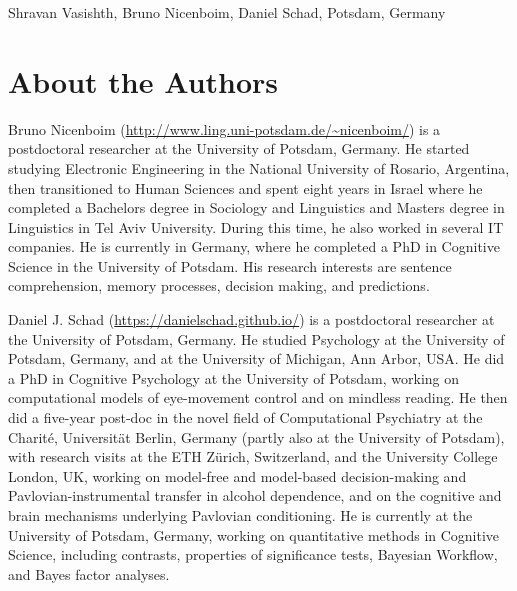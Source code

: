 \documentclass[12pt,]{krantz}
\theoremstyle{definition}
\theoremstyle{definition}
\theoremstyle{definition}
\theoremstyle{remark}
\let\BeginKnitrBlock\begin \let\EndKnitrBlock\end
\begin{document}
\BeginKnitrBlock{flushright}
Shravan Vasishth,
Bruno Nicenboim,
Daniel Schad,
Potsdam, Germany
\EndKnitrBlock{flushright}

\hypertarget{about-the-authors}{%
\chapter*{About the Authors}\label{about-the-authors}}


Bruno Nicenboim (\url{http://www.ling.uni-potsdam.de/~nicenboim/}) is a postdoctoral researcher at the University of Potsdam, Germany. He started studying Electronic Engineering in the National University of Rosario, Argentina, then transitioned to Human Sciences and spent eight years in Israel where he completed a Bachelors degree in Sociology and Linguistics and Masters degree in Linguistics in Tel Aviv University. During this time, he also worked in several IT companies. He is currently in Germany, where he completed a PhD in Cognitive Science in the University of Potsdam. His research interests are sentence comprehension, memory processes, decision making, and predictions.

Daniel J. Schad (\url{https://danielschad.github.io/}) is a postdoctoral researcher at the University of Potsdam, Germany. He studied Psychology at the University of Potsdam, Germany, and at the University of Michigan, Ann Arbor, USA. He did a PhD in Cognitive Psychology at the University of Potsdam, working on computational models of eye-movement control and on mindless reading. He then did a five-year post-doc in the novel field of Computational Psychiatry at the Charité, Universität Berlin, Germany (partly also at the University of Potsdam), with research visits at the ETH Zürich, Switzerland, and the University College London, UK, working on model-free and model-based decision-making and Pavlovian-instrumental transfer in alcohol dependence, and on the cognitive and brain mechanisms underlying Pavlovian conditioning. He is currently at the University of Potsdam, Germany, working on quantitative methods in Cognitive Science, including contrasts, properties of significance tests, Bayesian Workflow, and Bayes factor analyses.
\end{document}

